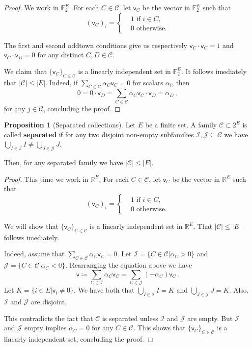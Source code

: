\documentclass[12pt]{amsart}
\theoremstyle{definition}
\newtheorem{prop}[thm]{Proposition}
\newcommand{\R}{\mathbb{R}}
\newcommand{\F}{\mathbb{F}}
\newcommand{\CC}{\mathcal C}
\newcommand{\JJ}{\mathcal J}
\newcommand{\II}{\mathcal I}
\newcommand{\vv}{\mathsf{v}}
\begin{document}
\begin{proof}
We work in $\F_2^E$.
For each $C \in \CC$, let $\vv_C$ be the vector in $\F_2^E$ such that 
$$ (\vv_C)_i =\begin{cases*}
      & 1 \text{ if $i \in C$,}\\
      & 0 \text{ otherwise.}
    \end{cases*} $$

The first and second oddtown conditions give us respectively $\vv_C \cdot \vv_C = 1$ and $\vv_C \cdot \vv_D = 0 $ for any distinct $C, D \in \CC$.

We claim that $\{\vv_C\}_{C \in \CC}$ is a linearly independent set in $\F_2^E$.
It follows imediately that $|\CC| \leq |E|$.
Indeed, if $\sum_{C \in \CC} \alpha_C \vv_C = 0$ for scalars $\alpha_i$, then
$$ 0 = 0 \cdot \vv_D = \sum_{C \in \CC} \alpha_C \vv_C\cdot \vv_D = \alpha_D\, ,$$
for any $j \in \CC$, concluding the proof.
\end{proof}


\begin{prop}[Separated collections]
Let $E$ be a finite set.
A family $\CC \subset 2^E $ is called \textbf{separated} if for any two disjoint non-empty subfamilies $\II, \JJ \subseteq \CC$ we have $\bigcup_{I\in\II} I \neq \bigcup_{J\in\JJ} J$.

Then, for any separated family we have $|\CC| \leq |E|$.
\end{prop}


\begin{proof}
This time we work in $\R^E$.
For each $C \in \CC$, let $\vv_C$ be the vector in $\R^E$ such that 
$$ (\vv_C)_i =\begin{cases*}
      & 1 \text{ if $i \in C$,}\\
      & 0 \text{ otherwise.}
    \end{cases*} $$


We will show that $ \{ \vv_C\}_{C\in \CC}$ is a linearly independent set in $\R^E$.
That $|\CC| \leq |E|$ follows imediately.

Indeed, assume that $\sum_{C \in \CC} \alpha_C \vv_C = 0$.
Let $\II = \{C \in \CC | \alpha_C > 0\}$ and $\JJ = \{C \in \CC | \alpha_C < 0\}$.
Rearranging the equation above we have
$$\vv \coloneqq \sum_{C \in \II} \alpha_C \vv_C  = \sum_{C \in \JJ} (- \alpha_C) \vv_C\, .$$
Let $K = \{i \in E| \vv_i \neq 0\}$.
We have both that $\bigcup_{I\in\II} I = K$ and $\bigcup_{J\in\JJ} J = K$.
Also, $\II$ and $\JJ$ are disjoint.

This contradicts the fact that $\CC$ is separated unless $\II$ and $\JJ$ are empty.
But $\II$ and $\JJ$ empty implies $\alpha_C = 0 $ for any $C \in \CC$.
This shows that $ \{ \vv_C\}_{C\in \CC}$ is a linearly independent set, concluding the proof.
\end{proof}
\end{document}
